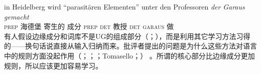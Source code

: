 \ex
\gll in Heidelberg wird "`parasitären Elementen"' unter den Professoren \emph{der} \emph{Garaus} \emph{gemacht}\footnotemark\\
	 \textsc{prep} 海德堡 \passiveprs{} 寄生的 成分 \textsc{prep} \textsc{det} 教授 \textsc{det} \textsc{garaus} 做\\
\zl
\noindent
有人假设边缘成分和词库不是UG的组成部分（\citealp[--151]{Chomsky86}；\citealp[]{Fodor98a}），而是利用其它学习方法习得的——换句话说直接从输入归纳而来。批评者提出的问题是为什么这些方法对语言中的规则方面没起作用（\citealp[]{Abney96a}；\citealp[]{Goldberg2003b}；\citealp[]{Newmeyer2005a}；Tomasello\citeyear[]{Tomasello2006a}；\citeyear[]{Tomasello2006c}） 。所谓的核心部分比边缘成分更加规则，所以应该更加容易学习。

